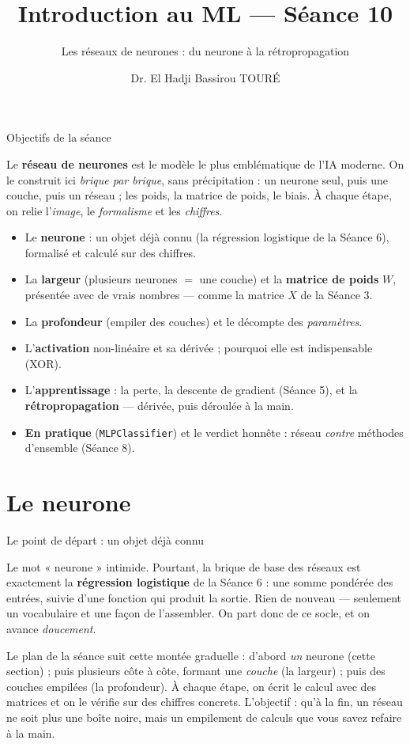 \documentclass[aspectratio=169,11pt]{beamer}
\title{Introduction au ML — Séance 10}
\subtitle{Les réseaux de neurones : du neurone à la rétropropagation}
\author{Dr. El Hadji Bassirou TOURÉ}
\institute{Département de Mathématiques et Informatique\\ Faculté des Sciences et Techniques\\ Université Cheikh Anta Diop de Dakar}
\date{}
\begin{document}
\begin{frame}\titlepage\end{frame}

\begin{frame}{Objectifs de la séance}
\begin{ucaddef}[Contenu]
{\small Le \textbf{réseau de neurones} est le modèle le plus emblématique de l'IA moderne. On le construit ici \emph{brique par brique}, sans précipitation : un neurone seul, puis une couche, puis un réseau ; les poids, la matrice de poids, le biais. À chaque étape, on relie l'\emph{image}, le \emph{formalisme} et les \emph{chiffres}.}
\end{ucaddef}
\begin{itemize}\small
  \item Le \textbf{neurone} : un objet déjà connu (la régression logistique de la Séance 6), formalisé et calculé sur des chiffres.
  \item La \textbf{largeur} (plusieurs neurones $=$ une couche) et la \textbf{matrice de poids} $W$, présentée avec de vrais nombres — comme la matrice $X$ de la Séance 3.
  \item La \textbf{profondeur} (empiler des couches) et le décompte des \emph{paramètres}.
  \item L'\textbf{activation} non-linéaire et sa dérivée ; pourquoi elle est indispensable (XOR).
  \item L'\textbf{apprentissage} : la perte, la descente de gradient (Séance 5), et la \textbf{rétropropagation} — dérivée, puis déroulée à la main.
  \item \textbf{En pratique} (\texttt{MLPClassifier}) et le verdict honnête : réseau \emph{contre} méthodes d'ensemble (Séance 8).
\end{itemize}
\end{frame}

\section{Le neurone}

\begin{frame}{Le point de départ : un objet déjà connu}
\begin{ucadfront}
{\small Le mot « neurone » intimide. Pourtant, la brique de base des réseaux est exactement la \textbf{régression logistique} de la Séance 6 : une somme pondérée des entrées, suivie d'une fonction qui produit la sortie. Rien de nouveau — seulement un vocabulaire et une façon de l'assembler. On part donc de ce socle, et on avance \emph{doucement}.}
\end{ucadfront}
{\small Le plan de la séance suit cette montée graduelle : d'abord \emph{un} neurone (cette section) ; puis plusieurs côte à côte, formant une \emph{couche} (la largeur) ; puis des couches empilées (la profondeur). À chaque étape, on écrit le calcul avec des matrices et on le vérifie sur des chiffres concrets. L'objectif : qu'à la fin, un réseau ne soit plus une boîte noire, mais un empilement de calculs que vous savez refaire à la main.}
\end{frame}
\end{document}
